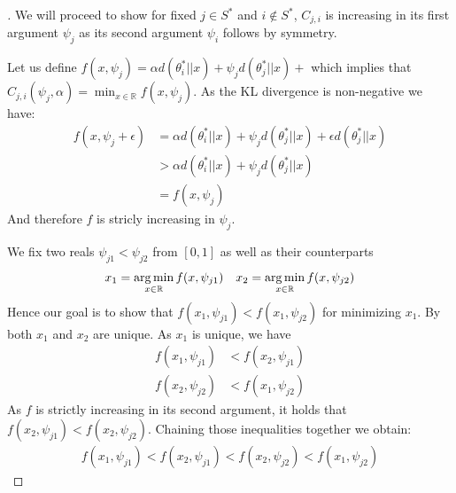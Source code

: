 \begin{proof}[]
  We will proceed to show for fixed $j \in S^*$ and $i \notin S^*$, $C_{j, i}$ is increasing in its first argument $\psi_j$ as its second argument $\psi_i$ follows by symmetry.

  Let us define $f(x, \psi_j) = \alpha d(\theta_i^*||x) + \psi_j d(\theta_j^*||x) + $ which implies that $C_{j, i}(\psi_j, \alpha) = \min_{x \in \mathbb{R}} f(x, \psi_j)$. As the KL divergence is non-negative we have:
  \begin{align}
    f(x, \psi_j + \epsilon) &= \alpha d(\theta_i^*||x) + \psi_j d(\theta_j^*||x) + \epsilon d(\theta_j^*||x) \\
    &> \alpha d(\theta_i^*||x) + \psi_j d(\theta_j^*||x)\\
    &= f(x, \psi_j)
  \end{align}
  And therefore $f$ is stricly increasing in $\psi_j$.

  We fix two reals $\psi_{j1} < \psi_{j2}$ from $[0, 1]$ as well as their counterparts
  \begin{align}
    &x_1 = \operatorname*{arg\,min}_{x \in \mathbb{R}} f(x, \psi_{j1})
    &x_2 = \operatorname*{arg\,min}_{x \in \mathbb{R}} f(x, \psi_{j2})
  \end{align}
  Hence our goal is to show that $f(x_1, \psi_{j1}) < f(x_1, \psi_{j2})$ for minimizing $x_1$. By  both $x_1$ and $x_2$ are unique. As $x_1$ is unique, we have
  \begin{align}
    f(x_1, \psi_{j1}) &< f(x_2, \psi_{j1}) \\
    f(x_2, \psi_{j2}) &< f(x_1, \psi_{j2})
  \end{align}
  As $f$ is strictly increasing in its second argument, it holds that $f(x_2, \psi_{j1}) < f(x_2, \psi_{j2})$. Chaining those inequalities together we obtain:
  \begin{align}
    f(x_1, \psi_{j1}) < f(x_2, \psi_{j1})  < f(x_2, \psi_{j2}) < f(x_1, \psi_{j2})
  \end{align}
\end{proof}

